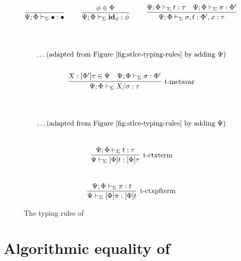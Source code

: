 \documentclass[10pt]{article}
\begin{document}
%
\begin{figure}[ht!]
\\
\begin{gather*}
\infer[]{
  \ctypeof{\Sigma}{\Psi}{\Phi}{\bullet}{\bullet}
}{
}
\qquad
\infer[]{
  \ctypeof{\Sigma}{\Psi}{\Phi}{\idsub{\phi}}{\phi}
}{
  \phi \in \Phi
}
\qquad
\infer[]{
  \ctypeof{\Sigma}{\Psi}{\Phi}{\sigma,t}{\Phi',x:\tau}
}{
  \ctypeof{\Sigma}{\Psi}{\Phi}{t}{\tau}
  &
  \ctypeof{\Sigma}{\Psi}{\Phi}{\sigma}{\Phi'}
}
\end{gather*}
\\
\\
\begin{gather*}
  \ldots \mbox{(adapted from Figure~\ref{fig:stlce-typing-rules} by adding $\Psi$)}
  \\
  \\
  \infer[\mbox{\typmetavar}]{
    \ctypeof{\Sigma}{\Psi}{\Phi}{\metavar{X}{\sigma}}{\tau}
  }{
    X:\ct{\Phi'}{\tau} \in \Psi
    & 
    \ctypeof{\Sigma}{\Psi}{\Phi}{\sigma}{\Phi'}
  }
\end{gather*}
\\
\\
\begin{gather*}
  \ldots \mbox{(adapted from Figure~\ref{fig:stlce-typing-rules} by adding $\Psi$)}
\end{gather*}
\\
\begin{gather*}
  \infer[\mbox{\typctxterm}]{
    \cmtypeof{\Sigma}{\Psi}{\ct{\Phi}{t}}{\ct{\Phi}{\tau}}
  }{
    \ctypeof{\Sigma}{\Psi}{\Phi}{t}{\tau}
  }
\end{gather*}
\\
\begin{gather*}
  \infer[\mbox{\typctxpfterm}]{
    \cmtypeof{\Sigma}{\Psi}{\ct{\Phi}{\pi}}{\ct{\Phi}{t}}
  }{
    \ctypeof{\Sigma}{\Psi}{\Phi}{\pi}{t}
  }
\end{gather*}

\caption{The typing rules of \STLCC}
\label{fig:stlcc-typing-rules}
\end{figure}


\section{Algorithmic equality of \STLCC}
\end{document}
